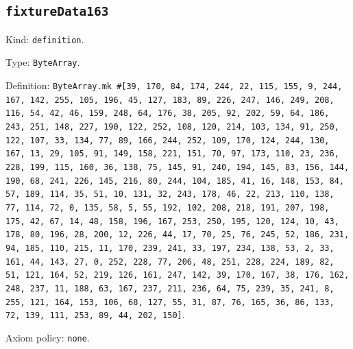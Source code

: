 \documentclass[11pt]{article}
\begin{document}
\subsection*{\texttt{fixtureData163}}
\noindent Kind: \texttt{definition}.\par
\noindent Type: \texttt{ByteArray}.\par
\noindent Definition: \texttt{ByteArray.mk \#[39, 170, 84, 174, 244, 22, 115, 155, 9, 244, 167, 142, 255, 105, 196, 45, 127, 183, 89, 226, 247, 146, 249, 208, 116, 54, 42, 46, 159, 248, 64, 176, 38, 205, 92, 202, 59, 64, 186, 243, 251, 148, 227, 190, 122, 252, 108, 120, 214, 103, 134, 91, 250, 122, 107, 33, 134, 77, 89, 166, 244, 252, 109, 170, 124, 244, 130, 167, 13, 29, 105, 91, 149, 158, 221, 151, 70, 97, 173, 110, 23, 236, 228, 199, 115, 160, 36, 138, 75, 145, 91, 240, 194, 145, 83, 156, 144, 190, 68, 241, 226, 145, 216, 80, 244, 104, 185, 41, 16, 148, 153, 84, 57, 189, 114, 35, 51, 10, 131, 32, 243, 178, 46, 22, 213, 110, 138, 77, 114, 72, 0, 135, 58, 5, 55, 192, 102, 208, 218, 191, 207, 198, 175, 42, 67, 14, 48, 158, 196, 167, 253, 250, 195, 120, 124, 10, 43, 178, 80, 196, 28, 200, 12, 226, 44, 17, 70, 25, 76, 245, 52, 186, 231, 94, 185, 110, 215, 11, 170, 239, 241, 33, 197, 234, 138, 53, 2, 33, 161, 44, 143, 27, 0, 252, 228, 77, 206, 48, 251, 228, 224, 189, 82, 51, 121, 164, 52, 219, 126, 161, 247, 142, 39, 170, 167, 38, 176, 162, 248, 237, 11, 188, 63, 167, 237, 211, 236, 64, 75, 239, 35, 241, 8, 255, 121, 164, 153, 106, 68, 127, 55, 31, 87, 76, 165, 36, 86, 133, 72, 139, 111, 253, 89, 44, 202, 150]}.\par
\noindent Axiom policy: \texttt{none}.\par
\end{document}

